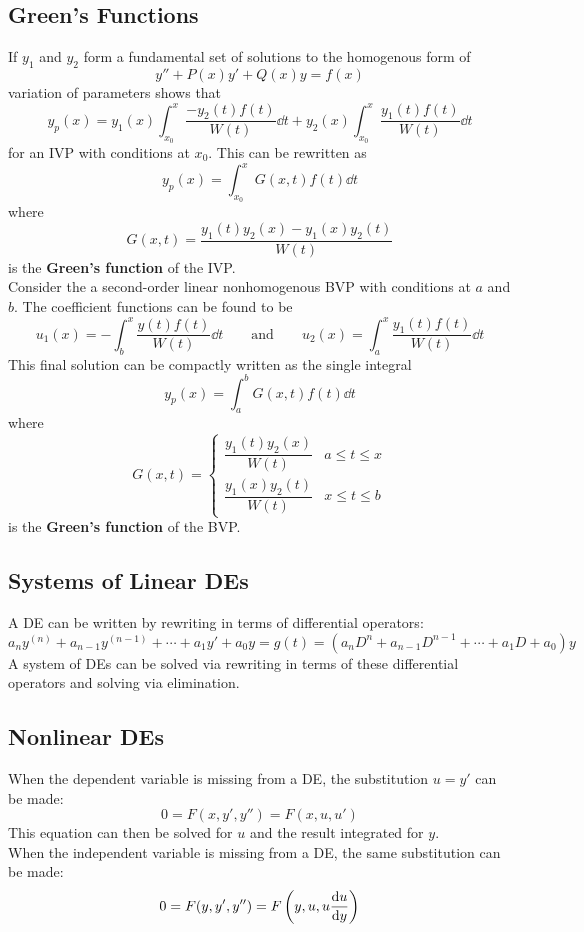 \documentclass[12pt, A4]{article}
\begin{document}
		\subsection{Green's Functions}
			If \(y_1\) and \(y_2\) form a fundamental set of solutions to the homogenous form of
				\[y'' + P(x)y' + Q(x)y = f(x)\]
				variation of parameters shows that
				\[y_p(x) = y_1(x)\int_{x_0}^x \frac{-y_2(t)f(t)}{W(t)}\dd{t} + y_2(x)\int_{x_0}^x \frac{y_1(t)f(t)}{W(t)}\dd{t}\]
				for an IVP with conditions at \(x_0\). This can be rewritten as
				\[\boxed{y_p(x) = \int_{x_0}^x G(x, t)f(t)\dd{t}}\]
				where
				\[\boxed{G(x, t) = \frac{y_1(t)y_2(x) - y_1(x)y_2(t)}{W(t)}}\]
				is the \textbf{Green's function} of the IVP. \\
			Consider the a second-order linear nonhomogenous BVP with conditions at \(a\) and \(b\). The coefficient functions can be found to be
				\[
					u_1(x) = -\int_b^x\frac{y(t)f(t)}{W(t)}\dd{t} \qquad \text{and} \qquad
					u_2(x) = \int_a^x\frac{y_1(t)f(t)}{W(t)}\dd{t}
				\]
				This final solution can be compactly written as the single integral
				\[\boxed{y_p(x) = \int_a^b G(x, t)f(t) \dd{t}}\]
				where
				\[\boxed{
					G(x, t) = \begin{cases}
						\dfrac{y_1(t)y_2(x)}{W(t)} & a \le t \le x \\
						\dfrac{y_1(x)y_2(t)}{W(t)} & x \le t \le b
					\end{cases}
				}\]
				is the \textbf{Green's function} of the BVP.
		\subsection{Systems of Linear DEs}
			A DE can be written by rewriting in terms of differential operators:
				\[
					a_ny^{(n)} + a_{n - 1}y^{(n - 1)} + \cdots + a_1y' + a_0y = g(t)
						= \left(a_nD^n + a_{n - 1}D^{n - 1} + \cdots + a_1D + a_0\right)y 
				\]
				A system of DEs can be solved via rewriting in terms of these differential operators and solving via elimination.
		\subsection{Nonlinear DEs}
			When the dependent variable is missing from a DE, the substitution \(u = y'\) can be made:
				\[
					0 = F(x, y', y'') 
						= F(x, u, u')
				\]
				This equation can then be solved for \(u\) and the result integrated for \(y\). \\
			When the independent variable is missing from a DE, the same substitution can be made:
				\[
					0 = F(y, y', y'')
						= F\left(y, u, u\dv{u}{y}\right)
				\]
\end{document}
